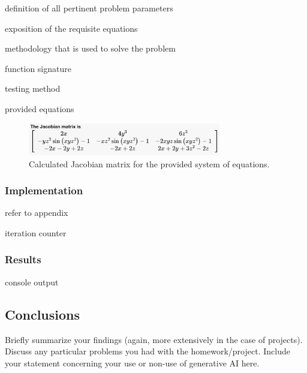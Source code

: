 \documentclass[10pt]{article}
\begin{document}
definition of all pertinent problem parameters

exposition of the requisite equations

methodology that is used to solve the problem

function signature 

testing method 

provided equations

\begin{figure}[h!]
\centering
\includegraphics[width=0.75\textwidth]{Jacobian.png}
\caption{Calculated Jacobian matrix for the provided system of equations.}
\end{figure}

\subsubsection*{Implementation}

refer to appendix 

iteration counter

\subsubsection*{Results}

console output

\pagebreak

\subsection*{Conclusions}
Briefly summarize your findings (again, more extensively in the case of projects).
Discuss any particular problems you had with the homework/project.
Include your statement concerning your use or non-use of generative AI here.

\pagebreak

\end{document}
